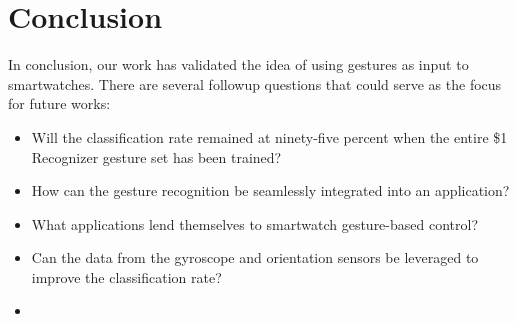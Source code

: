 \documentclass{report}
\begin{document}
\chapter{Conclusion}

In conclusion, our work has validated the idea of using gestures as input to smartwatches. There are several followup questions that could serve as the focus for future works:

\begin{itemize}
\item Will the classification rate remained at ninety-five percent when the entire \$1 Recognizer gesture set has been trained?
\item How can the gesture recognition be seamlessly integrated into an application?
\item What applications lend themselves to smartwatch gesture-based control?
\item Can the data from the gyroscope and orientation sensors be leveraged to improve the classification rate?
\item 
\end{itemize}

\printbibliography
\end{document}
